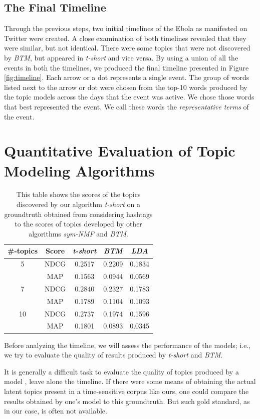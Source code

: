 \subsection{The Final Timeline}
Through the previous steps, two initial timelines of the Ebola as manifested on
Twitter were created.
A close examination of both timelines revealed that they were similar, but not identical.
There were some topics
that were not discovered by \emph{BTM}, but appeared in \emph{t-short} and vice versa.  
By using
a union of all the events in both the timelines, we produced
the final timeline presented in Figure \ref{fig:timeline}.
Each arrow
or a dot represents a single event.  The group of words listed next to the
arrow or dot were chosen from the top-10 words produced by the topic models
across the days that the event was active.  We chose those words that best
represented the event.
We call these words
the \emph{representative terms} of the event.

\section{Quantitative Evaluation of Topic Modeling Algorithms}
\label{sec:comparison}
\begin{table}
\centering
\begin{tabular}{|c|c|c|c|c|}
\hline
\#-topics & Score & \emph{t-short} & \emph{BTM} & \emph{LDA}\\
\hline
5 & NDCG & 0.2517 & 0.2209 & 0.1834\\
 &MAP &  0.1563   &  0.0944 & 0.0569\\
\hline
7 & NDCG & 0.2840 & 0.2327 & 0.1783 \\ 
 & MAP & 0.1789 &  0.1104 & 0.1093 \\
\hline
10 & NDCG & 0.2737 & 0.1974 & 0.1596\\
& MAP & 0.1801 & 0.0893 & 0.0345\\
\hline
\end{tabular}
\caption{This table shows the scores of the topics discovered by our algorithm \emph{t-short} on a groundtruth
obtained from considering hashtags to the scores of topics developed by other algorithms \emph{sym-NMF}
and \emph{BTM}.}
\label{table:groundtruth_table}
\end{table}
Before analyzing
the timeline, we will assess the performance of the
models; i.e., we try to evaluate the quality of results produced by
\emph{t-short} and \emph{BTM}.

It is generally a difficult task to evaluate the quality of topics
produced by a model \cite{chang2009reading}, leave alone the timeline.  
If there were some means
of obtaining the actual latent topics present in a time-sensitive corpus
like ours, one could compare
the results obtained by one's model to this groundtruth.  But such gold standard,
as in our case, is often not available.  

